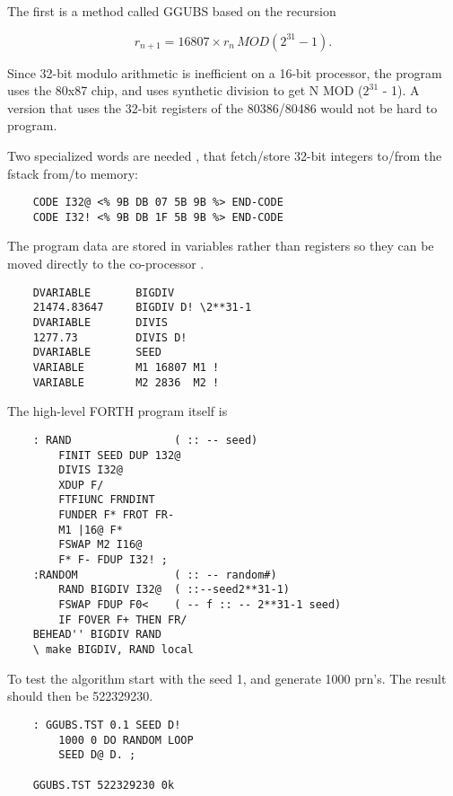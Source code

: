 The first is a method called GGUBS  based on the recursion

\begin{equation}
    r_{n+1} = 16807 \times{} r_n \, MOD (2^{31} - 1) .\nonumber
\end{equation}

Since 32-bit modulo arithmetic is inefficient on a 16-bit processor, the
program uses the 80x87 chip, and uses synthetic division
to get N MOD ($2^{31}$ - 1). A version that uses the 32-bit registers
of the 80386/80486 would not be hard to program.

Two specialized words are needed 
, that fetch/store 32-bit integers to/from the fstack from/to memory:

\begin{verbatim}
    CODE I32@ <% 9B DB 07 5B 9B %> END-CODE
    CODE I32! <% 9B DB 1F 5B 9B %> END-CODE
\end{verbatim}

The program data are stored in variables rather than registers so
they can be moved directly to the co-processor  .

\begin{verbatim}
    DVARIABLE       BIGDIV
    21474.83647     BIGDIV D! \2**31-1
    DVARIABLE       DIVIS
    1277.73         DIVIS D!
    DVARIABLE       SEED
    VARIABLE        M1 16807 M1 !
    VARIABLE        M2 2836  M2 !
\end{verbatim}

The high-level FORTH program itself is

\begin{verbatim}
    : RAND                ( :: -- seed)
        FINIT SEED DUP 132@
        DIVIS I32@
        XDUP F/
        FTFIUNC FRNDINT
        FUNDER F* FROT FR-
        M1 |16@ F*
        FSWAP M2 I16@
        F* F- FDUP I32! ;
    :RANDOM               ( :: -- random#)
        RAND BIGDIV I32@  ( ::--seed2**31-1)
        FSWAP FDUP F0<    ( -- f :: -- 2**31-1 seed)
        IF FOVER F+ THEN FR/
    BEHEAD'' BIGDIV RAND
    \ make BIGDIV, RAND local
\end{verbatim}
To test the algorithm start with the seed 1, and generate 1000
prn's. The result should then be 522329230.

\begin{verbatim}
    : GGUBS.TST 0.1 SEED D!
        1000 0 DO RANDOM LOOP
        SEED D@ D. ;

    GGUBS.TST 522329230 0k
\end{verbatim}

